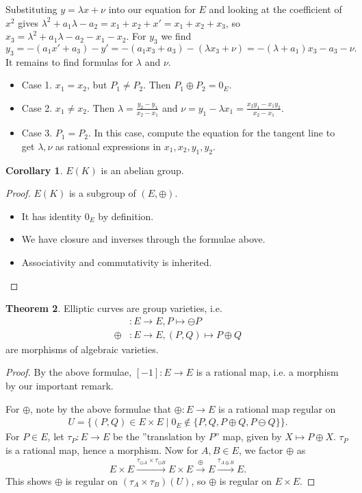 \documentclass{article}
\theoremstyle{definition}
\newtheorem{theorem}{Theorem}[section]
\newtheorem{cor}[theorem]{Corollary}
\begin{document}
Substituting $y = \lambda x + \nu$ into our equation for $E$ and looking at the coefficient of $x^2$ gives $\lambda^2 + a_1 \lambda - a_2 = x_1 + x_2 + x' = x_1 + x_2 + x_3$, so $x_3 = \lambda^2 +a_1 \lambda - a_2 - x_1 - x_2$. For $y_3$ we find $$y_3 = -(a_1x' + a_3) - y' = -(a_1x_3+a_3) - (\lambda x_3  + \nu) = - (\lambda+a_1)x_3 - a_3 - \nu.$$
It remains to find formulas for $\lambda$ and $\nu$.
\begin{itemize}
    \item Case 1. $x_1 = x_2$, but $P_1 \neq P_2$. Then $P_1 \oplus P_2 = 0_E$.
    \item Case 2. $x_1 \neq x_2$. Then $\lambda = \frac{y_2-y_1}{x_2-x_1}$ and $\nu = y_1 - \lambda x_1 = \frac{x_2y_1-x_1y_2}{x_2-x_1}$.
    \item Case 3. $P_1 = P_2$. In this case, compute the equation for the tangent line to get $\lambda, \nu$ as rational expressions in $x_1,x_2,y_1,y_2$.
\end{itemize}
\begin{cor}
    $E(K)$ is an abelian group.
\end{cor}
\begin{proof}
    $E(K)$ is a subgroup of $(E, \oplus)$.
    \begin{itemize}
        \item It has identity $0_E$ by definition.
        \item We have closure and inverses through the formulae above.
        \item Associativity and commutativity is inherited.
    \end{itemize}
\end{proof}
\begin{theorem}\label{theorem4.4}
    Elliptic curves are group varieties, i.e. 
    \begin{align*}
        [-1]&:E \to E, P \mapsto \ominus P\\
        \oplus&: E \to E, (P,Q) \mapsto P \oplus Q
    \end{align*}
    are morphisms of algebraic varieties.
\end{theorem}
\begin{proof}
    By the above formulae, $[-1]:E \to E$ is a rational map, i.e. a morphism by our important remark.
    \vspace{1mm}
     
    For $\oplus$, note by the above formulae that $\oplus : E \to E$ is a rational map regular on 
    \begin{align*}
        U = \{(P,Q) \in E \times E \mid 0_E \not\in \{P,Q, P \oplus Q, P \ominus Q  \}\}.
    \end{align*}
    For $P \in E$, let $\tau_P : E \to E$ be the ''translation by $P$'' map, given by $X \mapsto P \oplus X$. $\tau_P$ is a rational map, hence a morphism. Now for $A, B \in E$, we factor $\oplus$ as 
    \begin{align*}
        E \times E \stackrel{\tau_{\ominus A} \times \tau_{\ominus B}}{\to} E \times E \stackrel{\oplus}{\to} E \stackrel{\tau_{A\oplus B}}{\to} E.  
    \end{align*}
    This shows $\oplus$ is regular on $(\tau_{A} \times \tau_B)(U)$, so $\oplus$ is regular on $E \times E$.
\end{proof}
\end{document}
